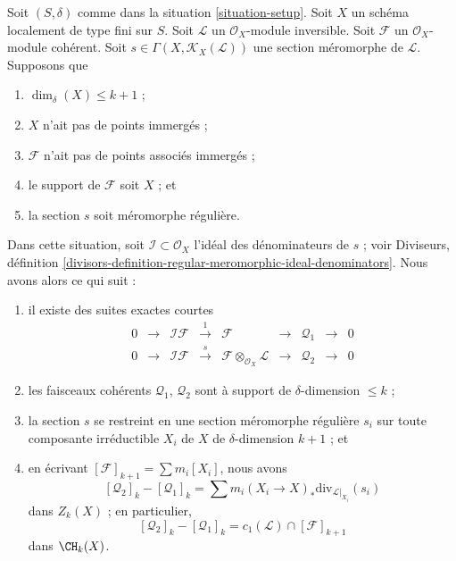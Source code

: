 \begin{lemma}
\label{lemma-no-embedded-points}
Soit $(S, \delta)$ comme dans la situation \ref{situation-setup}.
Soit $X$ un schéma localement de type fini sur $S$.
Soit $\mathcal{L}$ un $\mathcal{O}_X$-module inversible.
Soit $\mathcal{F}$ un $\mathcal{O}_X$-module cohérent.
Soit $s \in \Gamma(X, \mathcal{K}_X(\mathcal{L}))$ une
section méromorphe de $\mathcal{L}$.
Supposons que
\begin{enumerate}
\item $\dim_\delta(X) \leq k + 1$ ;
\item $X$ n'ait pas de points immergés ;
\item $\mathcal{F}$ n'ait pas de points associés immergés ;
\item le support de $\mathcal{F}$ soit $X$ ; et
\item la section $s$ soit méromorphe régulière.
\end{enumerate}
Dans cette situation, soit $\mathcal{I} \subset \mathcal{O}_X$
l'idéal des dénominateurs de $s$ ; voir
Diviseurs,
définition \ref{divisors-definition-regular-meromorphic-ideal-denominators}.
Nous avons alors ce qui suit :
\begin{enumerate}
\item il existe des suites exactes courtes
$$
\begin{matrix}
0 &
\to &
\mathcal{I}\mathcal{F} &
\xrightarrow{1} &
\mathcal{F} &
\to &
\mathcal{Q}_1 &
\to &
0 \\
0 &
\to &
\mathcal{I}\mathcal{F} &
\xrightarrow{s} &
\mathcal{F} \otimes_{\mathcal{O}_X} \mathcal{L} &
\to &
\mathcal{Q}_2 &
\to &
0
\end{matrix}
$$
\item les faisceaux cohérents $\mathcal{Q}_1$, $\mathcal{Q}_2$
sont à support de $\delta$-dimension $\leq k$ ;
\item la section $s$ se restreint en une section méromorphe régulière
$s_i$ sur toute composante irréductible $X_i$ de
$X$ de $\delta$-dimension $k + 1$ ; et
\item en écrivant $[\mathcal{F}]_{k + 1} = \sum m_i[X_i]$, nous avons
$$
[\mathcal{Q}_2]_k - [\mathcal{Q}_1]_k
=
\sum m_i(X_i \to X)_*\text{div}_{\mathcal{L}|_{X_i}}(s_i)
$$
dans $Z_k(X)$ ; en particulier,
$$
[\mathcal{Q}_2]_k - [\mathcal{Q}_1]_k
=
c_1(\mathcal{L}) \cap [\mathcal{F}]_{k + 1}
$$
dans $\CH_k(X)$.
\end{enumerate}
\end{lemma}

